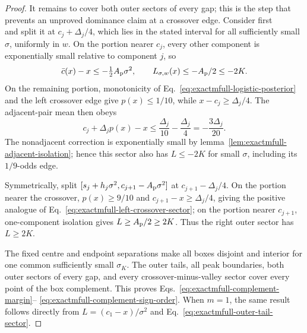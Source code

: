 \documentclass{iopjournal}
\theoremstyle{plain}
\theoremstyle{definition}
\begin{document}
\begin{proof}
It remains to cover both outer sectors of every gap; this is the step that
prevents an unproved dominance claim at a crossover edge.  Consider first
\begin{equation}
 [c_j+A_{\rm p}\sigma^2,s_j-h_j\sigma^2]
 \label{eq:exactmfull-left-gap-sector}
\end{equation}
and split it at \(c_j+\Delta_j/4\), which lies in the stated interval for all
sufficiently small \(\sigma\), uniformly in \(w\).  On the portion nearer
\(c_j\), every other component is exponentially small relative to component
\(j\), so
\begin{equation}
 \bar c(x)-x\le-\tfrac12A_{\rm p}\sigma^2,
 \qquad L_{\sigma,w}(x)\le-A_{\rm p}/2\le-2K.
 \label{eq:exactmfull-left-near-peak-sector}
\end{equation}
On the remaining portion, monotonicity of
Eq.~\eqref{eq:exactmfull-logistic-posterior} and the left crossover edge give
\(p(x)\le1/10\), while \(x-c_j\ge\Delta_j/4\).  The adjacent-pair mean then
obeys
\begin{equation}
 c_j+\Delta_jp(x)-x
 \le\frac{\Delta_j}{10}-\frac{\Delta_j}{4}
 =-\frac{3\Delta_j}{20}.
 \label{eq:exactmfull-left-crossover-sector}
\end{equation}
The nonadjacent correction is exponentially small by
lemma~\ref{lem:exactmfull-adjacent-isolation}; hence this sector also has
\(L\le-2K\) for small \(\sigma\), including its \(1/9\)-odds edge.

Symmetrically, split
\([s_j+h_j\sigma^2,c_{j+1}-A_{\rm p}\sigma^2]\) at
\(c_{j+1}-\Delta_j/4\).  On the portion nearer the crossover,
\(p(x)\ge9/10\) and \(c_{j+1}-x\ge\Delta_j/4\), giving the positive analogue
of Eq.~\eqref{eq:exactmfull-left-crossover-sector}; on the portion nearer
\(c_{j+1}\), one-component isolation gives
\(L\ge A_{\rm p}/2\ge2K\).  Thus the right outer sector has \(L\ge2K\).

The fixed centre and endpoint separations make all boxes disjoint and
interior for one common sufficiently small \(\sigma_K\).  The outer tails,
all peak boundaries, both outer sectors of every gap, and every
crossover-minus-valley sector cover every point of the box complement.
This proves Eqs.~\eqref{eq:exactmfull-complement-margin}--
\eqref{eq:exactmfull-complement-sign-order}.  When \(m=1\), the same result
follows directly from \(L=(c_1-x)/\sigma^2\) and
Eq.~\eqref{eq:exactmfull-outer-tail-sector}.
\end{proof}
\end{document}
